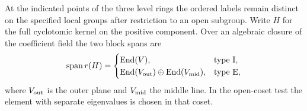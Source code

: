 \begin{proposition}
\label{prop:fitted-points-three-tests}
At the indicated points of the three level rings the ordered labels
remain distinct on the specified local groups after restriction
to an open subgroup. Write \(H\) for the full cyclotomic kernel on the positive component.
Over an algebraic closure of the coefficient field the two block spans are
\[
 \operatorname{span}r(H)=
 \begin{cases}
   \operatorname{End}(V),&\text{type I},\\
   \operatorname{End}(V_{\rm out})\oplus\operatorname{End}(V_{\rm mid}),&\text{type E},
 \end{cases}
\]
where \(V_{\rm out}\) is the outer plane and \(V_{\rm mid}\) the middle line. In the
open-coset test the element with separate eigenvalues is chosen
in that coset.
\end{proposition}

